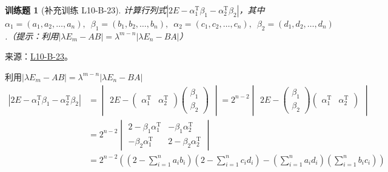 \documentclass[UTF8,12pt,a4paper,fontset=fandol]{ctexart}
\newtheorem{exercise}{训练题}[section]
\begin{document}
\begin{exercise}[补充训练 L10-B-23]\label{prob:L10-B-23}
计算行列式$|2E-\alpha_1^\mathrm{T}\beta_1-\alpha_2^\mathrm{T}\beta_2|$，其中$\alpha_1=(a_1,a_2,\ldots,a_n),\enspace \beta_1=(b_1,b_2,\ldots,b_n),\enspace \alpha_2=(c_1,c_2,\ldots,c_n),\enspace \beta_2 = (d_1,d_2,\ldots,d_n)$.（提示：利用$|\lambda E_m-AB|=\lambda^{m-n}|\lambda E_n-BA|$）
\end{exercise}
\noindent 来源：\href{https://github.com/yhwu-is/Linear-Algebra-Left-Undone/blob/new/%E8%AE%B2%E4%B9%89/%E4%B8%93%E9%A2%98/10%20%E8%A1%8C%E5%88%97%E5%BC%8F.tex}{L10-B-23}。
\begin{solve}
利用$|\lambda E_m-AB|=\lambda^{m-n}|\lambda E_n-BA|$
            \begin{align*}
                |2E-\alpha_1^\mathrm{T}\beta_1-\alpha_2^\mathrm{T}\beta_2|
                & =\begin{vmatrix}
                        2E-\begin{pmatrix}
                        \alpha_1^\mathrm{T} & \alpha_2^\mathrm{T}
                    \end{pmatrix}\begin{pmatrix}
                                        \beta_1 \\\beta_2
                                    \end{pmatrix}
                    \end{vmatrix}
                =2^{n-2}\begin{vmatrix}
                            2E-\begin{pmatrix}
                        \beta_1 \\\beta_2
                    \end{pmatrix}\begin{pmatrix}
                                        \alpha_1^\mathrm{T} & \alpha_2^\mathrm{T}
                                    \end{pmatrix}
                        \end{vmatrix}         \\
                & =2^{n-2}\begin{vmatrix}
                            2-\beta_1\alpha_1^\mathrm{T} & -\beta_1\alpha_2^\mathrm{T}  \\
                            -\beta_2\alpha_1^\mathrm{T}  & 2-\beta_2\alpha_2^\mathrm{T}
                        \end{vmatrix} \\
                & =2^{n-2}
                \left(\left(2-\sum_{i=1}^na_ib_i\right)
                \left(2-\sum_{i=1}^nc_id_i\right)
                -\left(\sum_{i=1}^na_id_i\right)
                \left(\sum_{i=1}^nb_ic_i\right)\right)
            \end{align*}
\end{solve}
\end{document}
